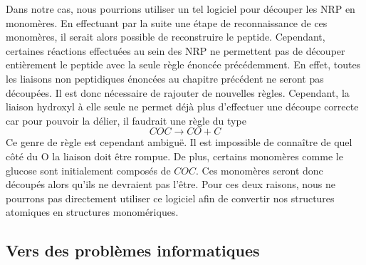 Dans notre cas, nous pourrions utiliser un tel logiciel pour découper les NRP en monomères.
En effectuant par la suite une étape de reconnaissance de ces monomères, il serait alors possible de reconstruire le peptide.
Cependant, certaines réactions effectuées au sein des NRP ne permettent pas de découper entièrement le peptide avec la seule règle énoncée précédemment.
En effet, toutes les liaisons non peptidiques énoncées au chapitre précédent ne seront pas découpées.
Il est donc nécessaire de rajouter de nouvelles règles.
Cependant, la liaison hydroxyl à elle seule ne permet déjà plus d'effectuer une découpe correcte car pour pouvoir la délier, il faudrait une règle du type
\begin{equation}
  COC \longrightarrow CO + C
\end{equation}
Ce genre de règle est cependant ambiguë.
Il est impossible de connaître de quel côté du O la liaison doit être rompue.
De plus, certains monomères comme le glucose sont initialement composés de $COC$.
Ces monomères seront donc découpés alors qu'ils ne devraient pas l'être.
Pour ces deux raisons, nous ne pourrons pas directement utiliser ce logiciel afin de convertir nos structures atomiques en structures monomériques.
% 
% 
% 




\subsection{Vers des problèmes informatiques}

